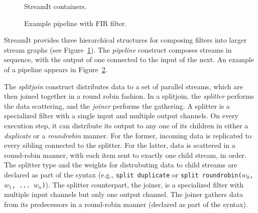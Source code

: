 \begin{figure}[t]
\begin{center}
 \caption{StreamIt containers.}
 \label{fig:containers}
\end{center}
\end{figure}

\begin{figure}[t]
\begin{center}
 \caption{Example pipeline with FIR filter.}
 \label{fig:pipeline}
\end{center}
\end{figure}

StreamIt provides three hierarchical structures for composing filters
into larger stream graphs (see Figure~\ref{fig:containers}). The 
{\it pipeline} construct composes streams in sequence, with the output
of one connected to the input of the next.   An example of a pipeline
appears in Figure~\ref{fig:pipeline}.

The {\it splitjoin} construct distributes data to a set of parallel
streams, which are then joined together in a round robin fashion.  In
a splitjoin, the {\it splitter} performs the data scattering, and the
{\it joiner} performs the gathering. A splitter is a specialized
filter with a single input and  multiple output channels. On 
every execution step, it can distribute its output to any one of
its children in either a {\it duplicate} or a {\it roundrobin}
manner. For the former, incoming data is replicated to every
sibling connected to the splitter. For the latter, data is scattered
in a round-robin manner, with each item sent to exactly one child
stream, in order.  The splitter type and the weights for distrubuting data to
child streams are declared as part of the syntax (e.g., \texttt{split
duplicate} or \texttt{split roundrobin($w_0$, $w_1$, ... $w_n$)}). The
splitter counterpart, the joiner, is a specialized filter with  
multiple input channels but only one output channel. The joiner
gathers data from its predecessors in a round-robin manner (declared
as part of the syntax). 

